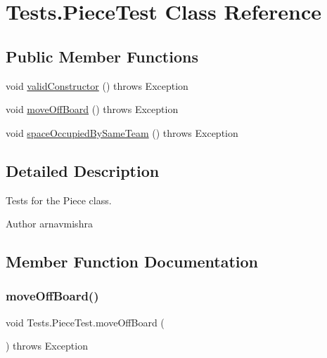 \hypertarget{class_tests_1_1_piece_test}{}\section{Tests.\+Piece\+Test Class Reference}
\label{class_tests_1_1_piece_test}
\subsection*{Public Member Functions}
\begin{DoxyCompactItemize}
\item 
void \hyperlink{class_tests_1_1_piece_test_aa826a8207b7c0c34461cadbd06e86683}{valid\+Constructor} ()  throws Exception 
\item 
void \hyperlink{class_tests_1_1_piece_test_a13e9d2cc31b678368486b03c204408e7}{move\+Off\+Board} ()  throws Exception 
\item 
void \hyperlink{class_tests_1_1_piece_test_af08d686557ed19d88e13e3b3e387ab39}{space\+Occupied\+By\+Same\+Team} ()  throws Exception 
\end{DoxyCompactItemize}


\subsection{Detailed Description}
Tests for the Piece class. \begin{DoxyAuthor}{Author}
arnavmishra 
\end{DoxyAuthor}


\subsection{Member Function Documentation}
\hypertarget{class_tests_1_1_piece_test_a13e9d2cc31b678368486b03c204408e7}{}\label{class_tests_1_1_piece_test_a13e9d2cc31b678368486b03c204408e7} 
\subsubsection{\texorpdfstring{move\+Off\+Board()}{moveOffBoard()}}
{\footnotesize\ttfamily void Tests.\+Piece\+Test.\+move\+Off\+Board (\begin{DoxyParamCaption}{ }\end{DoxyParamCaption}) throws Exception}

